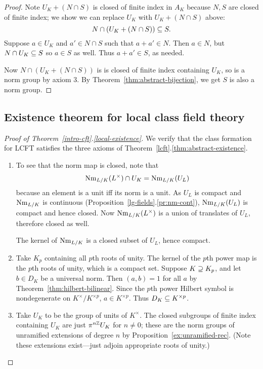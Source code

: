 \begin{proof}
Note $U_K+(N\cap S)$ is closed of finite index in $A_K$ because $N,S$ are closed of finite index; we show we can replace $U_K$ with $U_K+(N\cap S)$ above:
\[
N\cap (U_K+(N\cap S))\subseteq S.
\]
Suppose $a\in U_K$ and $a'\in N\cap S$ such that $a+a'\in N$. Then $a\in N$, but $N\cap U_K\subseteq S$ so $a\in S$ as well. Thus $a+a'\in S$, as needed. 

Now $N\cap (U_K+(N\cap S))$ is is closed of finite index containing $U_K$, so is a norm group by axiom 3. By Theorem~\ref{thm:abstract-bijection}, we get $S$ is also a norm group.
\end{proof}
\subsection{Existence theorem for local class field theory}
\begin{proof}[Proof of Theorem~\ref{intro-cft}.\ref{local-existence}]
We verify that the class formation for LCFT satisfies the three axioms of Theorem~\ref{lcft}.\ref{thm:abstract-existence}.
\begin{enumerate}
\item
To see that the norm map is closed, note that
\[
\operatorname{Nm}_{L/K}(L^{\times})\cap U_K=\operatorname{Nm}_{L/K}(U_L) 
\]
because an element is a unit iff its norm is a unit. As $U_L$ is compact and $\operatorname{Nm}_{L/K}$ is continuous (Proposition~\ref{lg-fields}.\ref{pr:nm-cont}), $\operatorname{Nm}_{L/K}(U_L)$ is compact and hence closed. Now $\operatorname{Nm}_{L/K}(L^{\times})$ is a union of translates of $U_L$, therefore closed as well. 

The kernel of $\operatorname{Nm}_{L/K}$ is a closed subset of $U_L$, hence compact.
\item
Take $K_p$ containing all $p$th roots of unity. The kernel of the $p$th power map is the $p$th roots of unity, which is a compact set. Suppose $K\supseteq K_p$, and let $b\in D_K$ be a universal norm. Then $(a,b)=1$ for all $a$ by Theorem~\ref{thm:hilbert-bilinear}. Since the $p$th power Hilbert symbol is nondegenerate on $K^{\times}/K^{\times p}$, $a\in K^{\times p}$. Thus $D_K\subseteq K^{\times p}$.
\item
Take $U_K$ to be the group of units of $K^{\times}$. The closed subgroups of finite index containing $U_K$ are just $\pi^{n\mathbb{Z}}U_K$ for $n\ne 0$; these are the norm groups of unramified extensions of degree $n$ by Proposition~\ref{ex:unramified-rec}. (Note these extensions exist---just adjoin appropriate roots of unity.)
\qedhere
\end{enumerate}
\end{proof}
